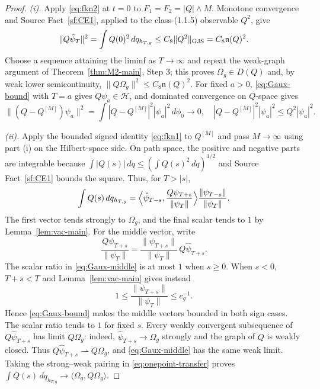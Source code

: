 \documentclass[11pt,a4paper]{article}
\theoremstyle{plain}
\theoremstyle{definition}
\newcommand{\HH}{\mathcal{H}}
\newcommand{\Om}{\Omega}
\newcommand{\ip}[2]{\langle #1,#2\rangle}
\begin{document}
\begin{proof}
\emph{(i).} Apply \eqref{eq:fkn2} at $t=0$ to
$F_1=F_2=|Q|\wedge M$. Monotone convergence and Source Fact~\ref{sf:CE1}, applied to the
class-(1.1.5) observable $Q^2$, give
\begin{equation}\label{eq:Gaux-bound}
 \|Q\hat\psi_T\|^2
 =\int Q(0)^2\,dq_{h_{T,g}}
 \le C_8\|Q^2\|_{\rm GJS}
 =C_8\mathfrak n(Q)^2.
\end{equation}
Choose a sequence attaining the liminf as $T\to\infty$ and repeat the weak-graph argument of
Theorem~\ref{thm:M2-main}, Step 3; this proves $\Om_g\in D(Q)$ and, by weak lower
semicontinuity, $\|Q\Om_g\|^2\le C_8\mathfrak n(Q)^2$. For fixed $a>0$,
\eqref{eq:Gaux-bound} with
$T=a$ gives $Q\psi_a\in\HH$, and dominated convergence on $Q$-space gives
\[
 \|(Q-Q^{[M]})\psi_a\|^2
 =\int |Q-Q^{[M]}|^2|\psi_a|^2\,d\phi_0\longrightarrow0,
 \quad |Q-Q^{[M]}|^2|\psi_a|^2\le Q^2|\psi_a|^2.
\]

\emph{(ii).} Apply the bounded signed identity \eqref{eq:fkn1} to $Q^{[M]}$ and pass
$M\to\infty$ using part (i) on the Hilbert-space side. On path space, the positive and negative
parts are integrable because
$\int|Q(s)|\,dq\le(\int Q(s)^2\,dq)^{1/2}$ and Source Fact~\ref{sf:CE1} bounds the square.
Thus, for $T>|s|$,
\begin{equation}\label{eq:onepoint-transfer}
 \int Q(s)\,dq_{h_{T,g}}
 =\Bigl\langle\hat\psi_{T-s},
      \frac{Q\psi_{T+s}}{\|\psi_T\|}\Bigr\rangle
      \frac{\|\psi_{T-s}\|}{\|\psi_T\|}.
\end{equation}
The first vector tends strongly to $\Om_g$, and the final scalar tends to $1$ by
Lemma~\ref{lem:vac-main}. For the middle vector, write
\begin{equation}\label{eq:Gaux-middle}
 \frac{Q\psi_{T+s}}{\|\psi_T\|}
 =\frac{\|\psi_{T+s}\|}{\|\psi_T\|}\,Q\hat\psi_{T+s}.
\end{equation}
The scalar ratio in \eqref{eq:Gaux-middle} is at most $1$ when $s\ge0$. When $s<0$,
$T+s<T$ and Lemma~\ref{lem:vac-main} gives instead
\[
 1\le\frac{\|\psi_{T+s}\|}{\|\psi_T\|}\le c_g^{-1}.
\]
Hence \eqref{eq:Gaux-bound} makes the middle vectors bounded in both sign cases. The scalar ratio tends to
$1$ for fixed $s$. Every weakly convergent subsequence of
$Q\hat\psi_{T+s}$ has limit $Q\Om_g$: indeed,
$\hat\psi_{T+s}\to\Om_g$ strongly and the graph of $Q$ is weakly closed. Thus
$Q\hat\psi_{T+s}\rightharpoonup Q\Om_g$, and \eqref{eq:Gaux-middle} has the same weak limit. Taking the
strong--weak pairing in \eqref{eq:onepoint-transfer} proves
$\int Q(s)\,dq_{h_{T,g}}\to\ip{\Om_g}{Q\Om_g}$.


\end{proof}
\end{document}
